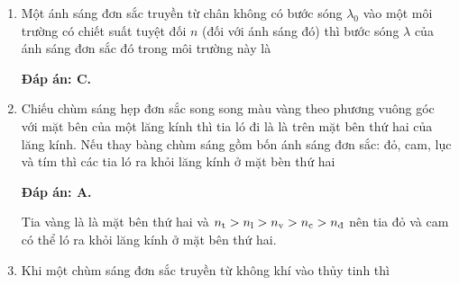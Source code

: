 \begin{enumerate}[label=\bfseries Câu \arabic*:]
{		
		
	}
	\item {} 
	\cauhoi
	{
		Một ánh sáng đơn sắc truyền từ chân không có bước sóng $\lambda_0$ vào một môi trường có chiết suất tuyệt đối $n$ (đối với ánh sáng đó) thì bước sóng $\lambda$ của ánh sáng đơn sắc đó trong môi trường này là
		
		
	}
	
	\loigiai
	{		\textbf{Đáp án: C.}
		
		
		
	}
		\item {} 
	\cauhoi
	{Chiếu chùm sáng hẹp đơn sắc song song màu vàng theo phương vuông góc với mặt bên của một lăng kính thì tia ló đi là là trên mặt bên thứ hai của lăng kính. Nếu thay bàng chùm sáng gồm bốn ánh sáng đơn sắc: đỏ, cam, lục và tím thì các tia ló ra khỏi lăng kính ở mặt bèn thứ hai
		
	}
	
	\loigiai
	{		\textbf{Đáp án: A.}
		
		Tia vàng là là mặt bên thứ hai và $n_\text t > n_\text l > n_\text v>n_\text c>n_\text{đ}$ nên tia đỏ và cam có thể ló ra khỏi lăng kính ở mặt bên thứ hai.
		
	}
		\item {} 
	\cauhoi
	{
		Khi một chùm sáng đơn sắc truyền từ không khí vào thủy tinh thì
		
	}
	

\end{enumerate}
